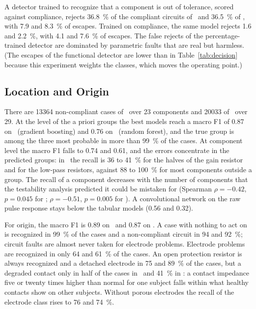 A detector trained to recognize that a component is out of tolerance, scored against compliance,
rejects \SI{36.8}{\percent} of the compliant circuits of \cA\ and \SI{36.5}{\percent} of \cB,
with 7.9 and \SI{8.3}{\percent} of escapes. Trained on compliance, the same model rejects 1.6
and \SI{2.2}{\percent}, with 4.1 and \SI{7.6}{\percent} of escapes. The false rejects of the
percentage-trained detector are dominated by parametric faults that are real but harmless. (The
escapes of the functional detector are lower than in Table~\ref{tab:decision} because this
experiment weights the classes, which moves the operating point.)

\subsection{Location and Origin}
\label{sec:res-location}

There are \num{13364} non-compliant cases of \cA\ over 23 components and \num{20033} of \cB\ over
29. At the level of the a priori groups the best models reach a macro F1 of 0.87 on \cA\
(gradient boosting) and 0.76 on \cB\ (random forest), and the true group is among the three most
probable in more than \SI{99}{\percent} of the cases. At component level the macro F1 falls to
0.74 and 0.61, and the errors concentrate in the predicted groups: in \cA\ the recall is 36 to
\SI{41}{\percent} for the halves of the gain resistor and for the low-pass resistors, against 88
to \SI{100}{\percent} for most components outside a group. The recall of a component decreases
with the number of components that the testability analysis predicted it could be mistaken for
(Spearman $\rho=-0.42$, $p=0.045$ for \cA; $\rho=-0.51$, $p=0.005$ for \cB). A convolutional
network on the raw pulse response stays below the tabular models (0.56 and 0.32).

For origin, the macro F1 is 0.89 on \cA\ and 0.87 on \cB. A case with nothing to act on is
recognized in \SI{99}{\percent} of the cases and a non-compliant circuit in 94 and
\SI{92}{\percent}; circuit faults are almost never taken for electrode problems. Electrode
problems are recognized in only 64 and \SI{61}{\percent} of the cases. An open protection
resistor is always recognized and a detached electrode in 75 and \SI{89}{\percent} of the cases,
but a degraded contact only in half of the cases in \cA\ and \SI{41}{\percent} in \cB: a contact
impedance five or twenty times higher than normal for one subject falls within what healthy
contacts show on other subjects. Without porous electrodes the recall of the electrode class
rises to 76 and \SI{74}{\percent}.

